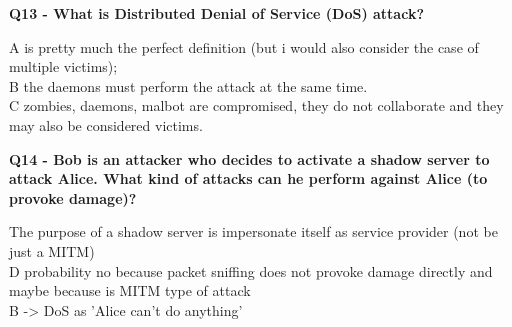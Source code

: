 \textbf{Q13 - What is Distributed Denial of Service (DoS) attack?}
\textcolor{Comment}{A is pretty much the perfect definition (but i would also consider the case of multiple victims); \\
B the daemons must perform the attack at the same time.\\
C zombies, daemons, malbot are compromised, they do not collaborate and they may also be considered victims.}

\textbf{Q14 - Bob is an attacker who decides to activate a shadow server to attack Alice. What kind of attacks can he perform against Alice (to provoke damage)?}
\textcolor{Comment}{The purpose of a shadow server is impersonate itself as service provider (not be just a MITM)\\
D probability no because packet sniffing does not provoke damage directly and maybe because is MITM type of attack  \\
 B -> DoS as 'Alice can't do anything' 
}


